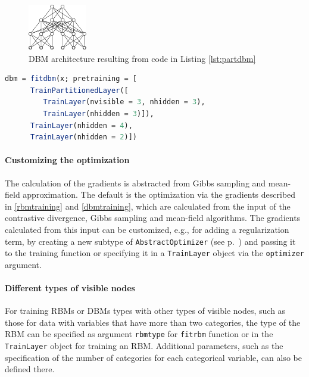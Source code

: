 \documentclass[12pt]{article}
\newcommand{\inlinecode}[1]{\texttt{#1}}
\begin{document}
\begin{figure}[h]
   \centering
   \includegraphics[scale=3.]{images/SmallPartitionedDBM.pdf}
   \caption{DBM architecture resulting from code in Listing \ref{lst:partdbm}}
\label{fig:smallpartitioneddbm}
\end{figure}

\begin{lstlisting}[language=Julia,caption={Fitting a partitioned DBM},label={lst:partdbm}, float=!h]
dbm = fitdbm(x; pretraining = [
      TrainPartitionedLayer([
         TrainLayer(nvisible = 3, nhidden = 3),
         TrainLayer(nhidden = 3)]),
      TrainLayer(nhidden = 4),
      TrainLayer(nhidden = 2)])
\end{lstlisting}

\FloatBarrier
\paragraph{Customizing the optimization}

The calculation of the gradients is abstracted from Gibbs sampling and mean-field approximation.
The default is the optimization via the gradients described in \ref{rbmtraining} and \ref{dbmtraining}, which are calculated from the input of the contrastive divergence, Gibbs sampling and mean-field algorithms.
The gradients calculated from this input can be customized, e.g., for adding a regularization term, by creating a new subtype of \inlinecode{AbstractOptimizer} (see p.\ \pageref{bms_AbstractOptimizer}) and passing it to the training function or specifying it in a \inlinecode{TrainLayer} object via the \inlinecode{optimizer} argument.


\paragraph{Different types of visible nodes}

For training RBMs or DBMs types with other types of visible nodes, such as those for data with variables that have more than two categories, the type of the RBM can be specified as argument \inlinecode{rbmtype} for \inlinecode{fitrbm} function or in the \inlinecode{TrainLayer} object for training an RBM.
Additional parameters, such as the specification of the number of categories for each categorical variable, can also be defined there.
\end{document}
